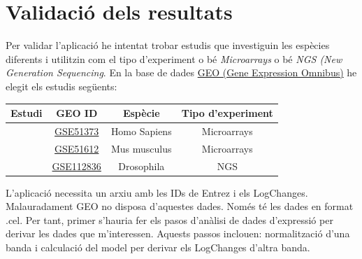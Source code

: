 \documentclass[]{article}
\begin{document}
\section{Validació dels resultats}

Per validar l'aplicació he intentat trobar estudis que investiguin les espècies diferents i utilitzin com el tipo d'experiment o bé \textit{Microarrays} o bé \textit{NGS (New Generation Sequencing}. En la base de dades \href{https://www.ncbi.nlm.nih.gov/geo/}{GEO (Gene Expression Omnibus)} he elegit els estudis següents:

\begin{center}
 \begin{tabular}{||c  | c | c | c ||} 
 \hline 
 Estudi & GEO ID & Espècie & Tipo d'experiment \\ [0.5ex] 
 \hline\hline
 \cite{koti2013identification}  & \href{https://www.ncbi.nlm.nih.gov/geo/query/acc.cgi?acc=GSE51373}{GSE51373}& Homo Sapiens  & Microarrays \\ 
 \hline
  \cite{sgado2013transcriptome}  & \href{https://www.ncbi.nlm.nih.gov/geo/query/acc.cgi?acc=GSE51612}{GSE51612}& Mus musculus  & Microarrays \\ 
  \hline
  \cite{graze2018perturbation}  & \href{https://www.ncbi.nlm.nih.gov/geo/query/acc.cgi?acc=GSE112836}{GSE112836}& Drosophila  & NGS \\ 
 \hline
\end{tabular}
\end{center}

L'aplicació necessita un arxiu amb les IDs de Entrez i els LogChanges. Malauradament GEO no disposa d'aquestes dades. Només té les dades en format .cel. Per tant, primer s'hauria fer els pasos d'anàlisi de dades d'expressió per derivar les dades que m'interessen. Aquests passos inclouen: normalització d'una banda i calculació del model per derivar els LogChanges d'altra banda.   




\end{document}
